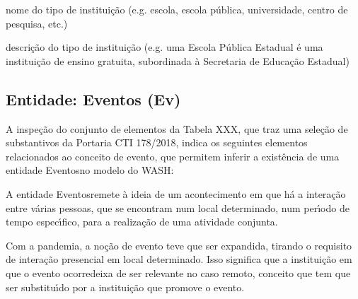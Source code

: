 \documentclass[
12pt,		%
openright,	%
twoside,  %
a4paper,			%
chapter=TITLE,		%
english,			%
french,				%
spanish,			%
brazil				%
]{USPSC-classe/USPSC}
\begin{document}
\begin{alineas}
\item nome do tipo de institui\c{c}\~ao (e.g. escola, escola p\'ublica, universidade, centro de pesquisa, etc.)
\item descri\c{c}\~ao do tipo de institui\c{c}\~ao (e.g. \textquotedbl uma Escola P\'ublica Estadual \'e uma institui\c{c}\~ao de ensino gratuita, subordinada \`a Secretaria de Educa\c{c}\~ao Estadual\textquotedbl )
\end{alineas}

\subsection[Entidade: Eventos (Ev)]{Entidade: Eventos (Ev)}\label{Entidade: Eventos (Ev)}
A inspe\c{c}\~ao do conjunto de elementos da Tabela XXX, que traz uma sele\c{c}\~ao de substantivos da Portaria CTI 178/2018, indica os seguintes elementos relacionados ao conceito de \textquotedbl evento\textquotedbl , que permitem inferir a exist\^encia de uma entidade \textquotedbl Eventos\textquotedbl  no modelo do WASH:











\noindent\begin{center}\mbox{\centering{}}\end{center}


A entidade \textquotedbl Eventos\textquotedbl  remete \`a ideia de um acontecimento em que h\'a a intera\c{c}\~ao entre v\'arias pessoas, que se encontram num local determinado, num per\'{\i}odo de tempo espec\'{\i}fico, para a realiza\c{c}\~ao de uma atividade conjunta.










Com a pandemia, a no\c{c}\~ao de evento teve que ser expandida, tirando o requisito de intera\c{c}\~ao presencial em local determinado. Isso significa que \textquotedbl a institui\c{c}\~ao em que o evento ocorre\textquotedbl  deixa de ser relevante no caso remoto, conceito que tem que ser substitu\'{\i}do por \textquotedbl a institui\c{c}\~ao que promove o evento\textquotedbl .
\end{document}
